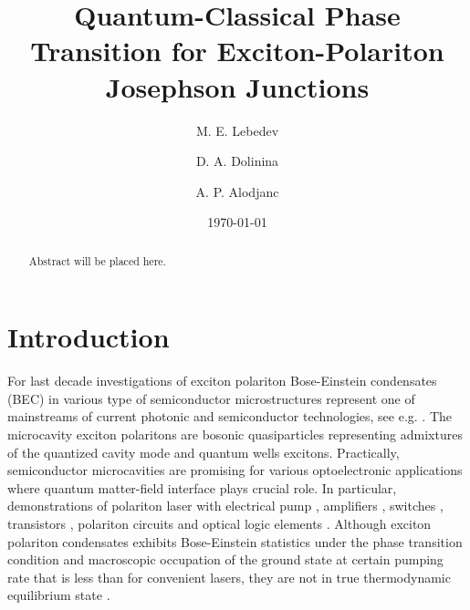 \documentclass[aps, pre, preprint, groupedaddress, superscriptaddress, showkeys, showpacs] {revtex4-1}
\begin{document}
\title{Quantum-Classical Phase Transition for Exciton-Polariton Josephson Junctions}

\author{M. E. Lebedev}

\author{D. A. Dolinina}

\author{A. P. Alodjanc}

\date{\today}

\begin{abstract}
Abstract will be placed here.
\end{abstract}

\pacs{\dots}
\keywords{\dots}

\maketitle

\newcommand{\sn}{\textrm{sn}}
\newcommand{\cn}{\textrm{cn}}
\newcommand{\dn}{\textrm{dn}}
\newcommand{\sd}{\textrm{sd}}
\newcommand{\cd}{\textrm{cd}}
\newcommand{\nd}{\textrm{nd}}
\newcommand{\am}{\textrm{am}}

\newcommand{\red}{\color{red}}

\section{Introduction \label{sec:introduction}}

For last decade investigations of exciton polariton Bose-Einstein condensates (BEC) in various type of semiconductor microstructures represent one of mainstreams of current photonic and semiconductor technologies, see e.g. \cite{Sanvitto,Guillet}.
The microcavity exciton polaritons are bosonic quasiparticles representing  admixtures of the quantized cavity mode and quantum wells excitons.
Practically, semiconductor microcavities are promising for various optoelectronic applications where quantum  matter-field interface plays crucial role.
In particular, demonstrations of polariton laser with electrical pump \cite{Bhattacharya,Schneider}, amplifiers \cite{Niemietz}, switches \cite{Amo_2010}, transistors \cite{Ballarini}, polariton circuits and optical logic elements \cite{Sturm,Liew}.
Although exciton polariton condensates exhibits Bose-Einstein statistics under the phase transition condition and macroscopic occupation of the ground state at certain pumping rate that is less than for convenient lasers, they are not in true thermodynamic equilibrium state \cite{Byrnes_2014,Sun}.
  
\end{document}
